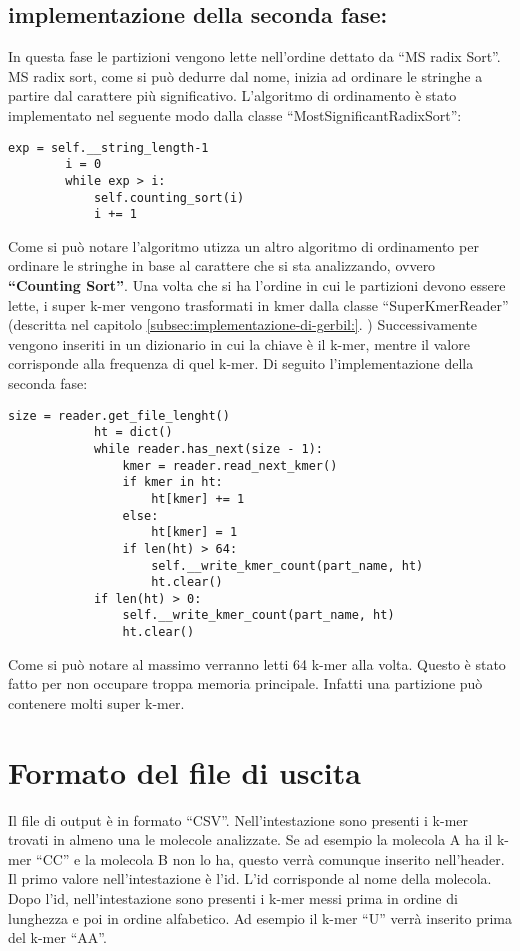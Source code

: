 \subsection{implementazione della seconda fase:}\label{subsec:seconda-fase:}
In questa fase le partizioni vengono lette nell'ordine dettato da ``MS radix Sort''.
MS radix sort, come si pu\`o dedurre dal nome, inizia ad ordinare le stringhe a partire dal carattere pi\`u significativo.
L'algoritmo di ordinamento \`e stato implementato nel seguente modo dalla classe ``MostSignificantRadixSort'':
\begin{lstlisting}[label={lst:ms-radix-sort}]
    exp = self.__string_length-1
        i = 0
        while exp > i:
            self.counting_sort(i)
            i += 1
\end{lstlisting}
Come si pu\`o notare l'algoritmo utizza un altro algoritmo di ordinamento per ordinare le stringhe in base al carattere che si sta analizzando, ovvero \textbf{``Counting Sort''}.
Una volta che si ha l'ordine in cui le partizioni devono essere lette, i super k-mer vengono trasformati in kmer dalla classe ``SuperKmerReader'' (descritta nel capitolo \ref{subsec:implementazione-di-gerbil:}. )
Successivamente vengono inseriti in un dizionario in cui la chiave \`e il k-mer, mentre il valore corrisponde alla frequenza di quel k-mer.
Di seguito l'implementazione della seconda fase:
\begin{lstlisting}[label={lst:implementazione-seconda-fase-KMC3}]
    size = reader.get_file_lenght()
            ht = dict()
            while reader.has_next(size - 1):
                kmer = reader.read_next_kmer()
                if kmer in ht:
                    ht[kmer] += 1
                else:
                    ht[kmer] = 1
                if len(ht) > 64:
                    self.__write_kmer_count(part_name, ht)
                    ht.clear()
            if len(ht) > 0:
                self.__write_kmer_count(part_name, ht)
                ht.clear()
\end{lstlisting}
Come si pu\`o notare al massimo verranno letti 64 k-mer alla volta.
Questo \`e stato fatto per non occupare troppa memoria principale.
Infatti una partizione pu\`o contenere molti super k-mer.
\section{Formato del file di uscita}\label{sec:formato-del-file-di-uscita}
Il file di output \`e in formato ``CSV''.
Nell'intestazione sono presenti i k-mer trovati in almeno una le molecole analizzate.
Se ad esempio la molecola A ha il k-mer ``CC'' e la molecola B non lo ha, questo verr\`a comunque inserito nell'header.
Il primo valore nell'intestazione \`e l'id.
L'id corrisponde al nome della molecola.
Dopo l'id, nell'intestazione sono presenti i k-mer messi prima in ordine di lunghezza e poi in ordine alfabetico.
Ad esempio il k-mer ``U'' verr\`a inserito prima del k-mer ``AA''.
